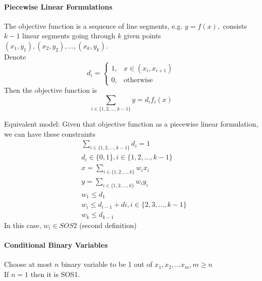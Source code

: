             \paragraph{Piecewise Linear Formulations}
                 The objective function is a sequence of line segments, e.g. $y=f(x), $ consists $k-1$ linear segments going through $k$ given points $(x_1, y_1), (x_2, y_2), ... ,(x_k, y_k)$.\\
                Denote 
                \begin{equation*}d_i=\begin{cases}1, & x\in (x_i, x_{i+1})\\0, & \text{otherwise} \end{cases}\end{equation*}
                Then the objective function is
                \begin{equation*}\sum_{i \in \{1, 2, ..., k-1\}} y = d_if_i(x) \end{equation*} 
                
                Equivalent model: Given that objective function as a piecewise linear formulation, we can have these constraints\\
                \begin{align*}
                    &\sum_{i \in \{1, 2, ..., k-1\}} d_i =1  \\
                    &d_i \in \{0, 1\}, i \in \{1, 2, ..., k-1\}  \\
                    & x = \sum_{i \in \{1, 2, ..., k\}} w_i x_i  \\
                    & y = \sum_{i \in \{1, 2, ..., k\}} w_i y_i  \\
                    & w_1 \le d_1  \\
                    & w_i \le d_{i-1} + d{i}, i \in \{2, 3, ..., k-1\}  \\
                    & w_k \le d_{k-1} 
                \end{align*}
                In this case, $ w_i \in SOS2$ (second definition)       
                                    
            \paragraph{Conditional Binary Variables}
                 Choose at most $n$ binary variable to be 1 out of  $x_1, x_2, ... x_m, m\ge n$\\
                If $n=1$ then it is SOS1.\\
                
